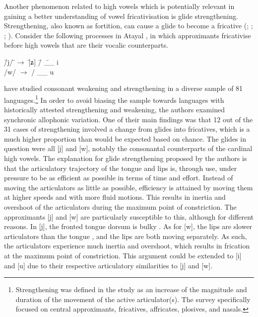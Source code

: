 \documentclass[output=paper,colorlinks,citecolor=brown,chinesefont]{langscibook}
\begin{document}
Another phenomenon related to high vowels which is potentially relevant in gaining a better understanding of vowel fricativisation is glide strengthening. Strengthening, also known as fortition, can cause a glide to become a fricative (\cite{Huang_2020};
;
;
).
Consider the following processes in Atayal \citep{Huang_2020}, in which approximants fricativise before high vowels that are their vocalic counterparts.

\ea \label{atayal}
    \begin{tabbing}
 \quad \=/j/ \quad \=$\rightarrow$ \quad \= [ʑ] \quad \= / \quad \= \_\_ i \\
\>/w/ \> $\rightarrow$ \> [ɣ] \> / \> \_\_ u 
    \end{tabbing}
\z

\citet{Bybee_and_Easterday_2019} have studied consonant weakening and strengthening in a diverse sample of 81 languages.\footnote{Strengthening was defined in the study as an increase of the magnitude and duration of the movement of the active articulator(s). The survey specifically focused on central approximants, fricatives, affricates, plosives, and nasals.} In order to avoid biasing the sample towards languages with historically attested strengthening and weakening, the authors examined synchronic allophonic variation. One of their main findings was that 12 out of the 31 cases of strengthening involved a change from glides into fricatives, which is a much higher proportion than would be expected based on chance. The glides in question were all [j] and [w], notably the consonantal counterparts of the cardinal high vowels. The explanation for glide strengthening proposed by the authors is that the articulatory trajectory of the tongue and lips is, through use, under pressure to be as efficient as possible in terms of time and effort. Instead of moving the articulators as little as possible, efficiency is attained by moving them at higher speeds and with more fluid motions. This results in inertia and overshoot of the articulators during the maximum point of constriction. The approximants [j] and [w] are particularly susceptible to this, although for different reasons. In [j], the fronted tongue dorsum is bulky \citep{Recasens_and_Espinosa_2009}. As for [w], the lips are slower articulators than the tongue \citep[111]{Gordon_2016}, and the lips are both moving separately. As such, the articulators experience much inertia and overshoot, which results in frication at the maximum point of constriction. This argument could be extended to [i] and [u] due to their respective articulatory similarities to [j] and [w].
\end{document}
